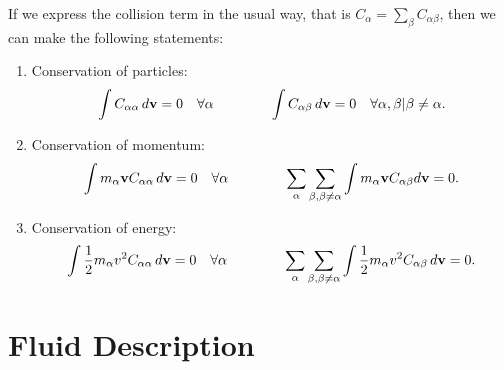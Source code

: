 \documentclass[a4paper,11pt]{report}
\begin{document}
If we express the collision term in the usual way, that is $C_\alpha = \sum_\beta C_{\alpha \beta}$, then we can make the following statements:
\begin{enumerate}
\item Conservation of particles:
\begin{equation}
\int C_{\alpha \alpha} \, d\mathbf{v} = 0 \quad \forall \alpha \qquad \qquad
\int C_{\alpha \beta} \,d\mathbf{v} = 0 \quad \forall \alpha, \beta | \beta \ne \alpha.
\end{equation}

\item Conservation of momentum:
\begin{equation}
\int m_\alpha \mathbf{v} C_{\alpha \alpha} \, d\mathbf{v} = 0 \quad \forall \alpha \qquad \qquad \sum_\alpha \sum_{\beta, \beta \ne \alpha} \int m_\alpha \mathbf{v} C_{\alpha \beta} d\mathbf{v} = 0.
\end{equation}

\item Conservation of energy:
\begin{equation}
\int \frac{1}{2} m_\alpha v^2 C_{\alpha \alpha} \, d\mathbf{v} = 0 \quad \forall \alpha \qquad \qquad \sum_\alpha \sum_{\beta, \beta \ne \alpha} \int \frac{1}{2} m_\alpha v^2 C_{\alpha \beta} \, d\mathbf{v} = 0.
\end{equation}

\end{enumerate}

\part{Fluid Description}                                                  %

\end{document}
